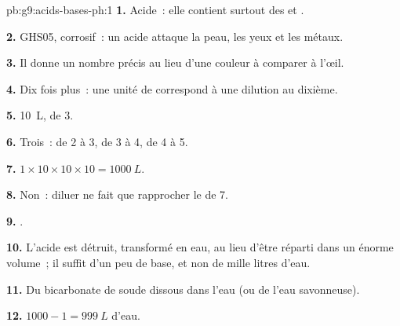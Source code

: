 \begin{solution}{pb:g9:acids-bases-ph:1}
\textbf{1.} Acide~: elle contient surtout des   et
.

\textbf{2.} GHS05, corrosif~: un acide attaque la peau, les yeux et les
métaux.

\textbf{3.} Il donne un nombre précis au lieu d'une couleur à comparer à
l'œil.

\textbf{4.} Dix fois plus~: une unité de  correspond à une dilution au
dixième.

\textbf{5.} \qty{10}{L}, de  3.

\textbf{6.} Trois~: de  2 à 3, de 3 à 4, de 4 à 5.

\textbf{7.} $1 \times 10 \times 10 \times 10 = \qty{1000}{L}$.

\textbf{8.} Non~: diluer ne fait que rapprocher le  de 7.

\textbf{9.} .

\textbf{10.} L'acide est détruit, transformé en eau, au lieu d'être
réparti dans un énorme volume~; il suffit d'un peu de base, et non de
mille litres d'eau.

\textbf{11.} Du bicarbonate de soude dissous dans l'eau (ou de l'eau
savonneuse).

\textbf{12.} $1000 - 1 = \qty{999}{L}$ d'eau.
\end{solution}
